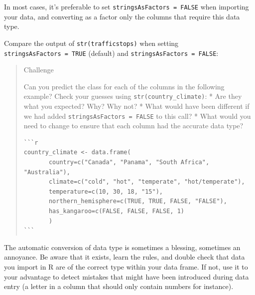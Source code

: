 \documentclass[]{book}
\newenvironment{Shaded}{\begin{snugshade}}{\end{snugshade}}
\newcommand{\KeywordTok}[1]{\textcolor[rgb]{0.13,0.29,0.53}{\textbf{{#1}}}}
\newcommand{\DataTypeTok}[1]{\textcolor[rgb]{0.13,0.29,0.53}{{#1}}}
\newcommand{\StringTok}[1]{\textcolor[rgb]{0.31,0.60,0.02}{{#1}}}
\newcommand{\OtherTok}[1]{\textcolor[rgb]{0.56,0.35,0.01}{{#1}}}
\newcommand{\NormalTok}[1]{{#1}}
\theoremstyle{definition}
\theoremstyle{definition}
\theoremstyle{remark}
\begin{document}
In most cases, it's preferable to set
\texttt{stringsAsFactors\ =\ FALSE} when importing your data, and
converting as a factor only the columns that require this data type.

Compare the output of \texttt{str(trafficstops)} when setting
\texttt{stringsAsFactors\ =\ TRUE} (default) and
\texttt{stringsAsFactors\ =\ FALSE}:

\begin{Shaded}
\end{Shaded}

\begin{quote}
Challenge

Can you predict the class for each of the columns in the following
example? Check your guesses using \texttt{str(country\_climate)}: * Are
they what you expected? Why? Why not? * What would have been different
if we had added \texttt{stringsAsFactors\ =\ FALSE} to this call? * What
would you need to change to ensure that each column had the accurate
data type?

\begin{verbatim}
```r
country_climate <- data.frame(
       country=c("Canada", "Panama", "South Africa", "Australia"),
       climate=c("cold", "hot", "temperate", "hot/temperate"),
       temperature=c(10, 30, 18, "15"),
       northern_hemisphere=c(TRUE, TRUE, FALSE, "FALSE"),
       has_kangaroo=c(FALSE, FALSE, FALSE, 1)
       )
```
\end{verbatim}
\end{quote}

The automatic conversion of data type is sometimes a blessing, sometimes
an annoyance. Be aware that it exists, learn the rules, and double check
that data you import in R are of the correct type within your data
frame. If not, use it to your advantage to detect mistakes that might
have been introduced during data entry (a letter in a column that should
only contain numbers for instance).
\end{document}
